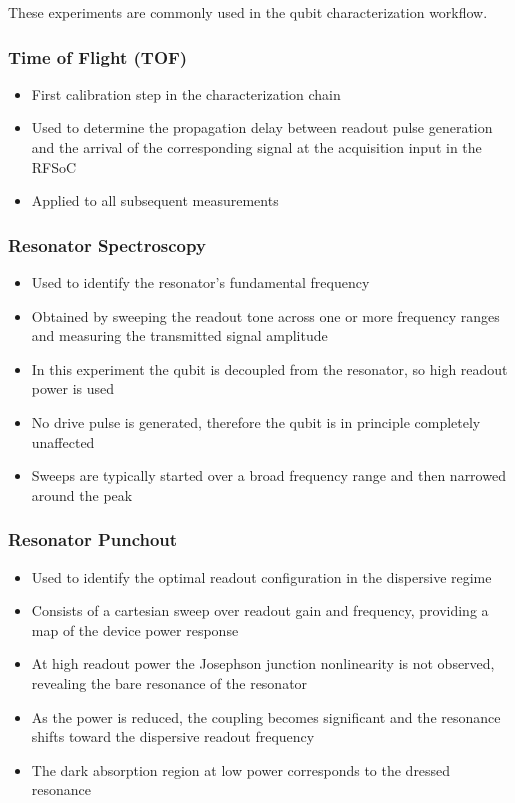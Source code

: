 \documentclass[
]{article}
\providecommand{\tightlist}{%
  \setlength{\itemsep}{0pt}\setlength{\parskip}{0pt}}
\begin{document}
These experiments are commonly used in the qubit characterization
workflow.

\subsubsection{Time of Flight (TOF)}\label{time-of-flight-tof}

\begin{itemize}
\tightlist
\item
  First calibration step in the characterization chain
\item
  Used to determine the propagation delay between readout pulse
  generation and the arrival of the corresponding signal at the
  acquisition input in the RFSoC
\item
  Applied to all subsequent measurements
\end{itemize}

\subsubsection{Resonator Spectroscopy}\label{resonator-spectroscopy}

\begin{itemize}
\tightlist
\item
  Used to identify the resonator's fundamental frequency
\item
  Obtained by sweeping the readout tone across one or more frequency
  ranges and measuring the transmitted signal amplitude
\item
  In this experiment the qubit is decoupled from the resonator, so high
  readout power is used
\item
  No drive pulse is generated, therefore the qubit is in principle
  completely unaffected
\item
  Sweeps are typically started over a broad frequency range and then
  narrowed around the peak
\end{itemize}

\subsubsection{Resonator Punchout}\label{resonator-punchout}

\begin{itemize}
\tightlist
\item
  Used to identify the optimal readout configuration in the dispersive
  regime
\item
  Consists of a cartesian sweep over readout gain and frequency,
  providing a map of the device power response
\item
  At high readout power the Josephson junction nonlinearity is not
  observed, revealing the bare resonance of the resonator
\item
  As the power is reduced, the coupling becomes significant and the
  resonance shifts toward the dispersive readout frequency
\item
  The dark absorption region at low power corresponds to the dressed
  resonance
\end{itemize}
\end{document}
